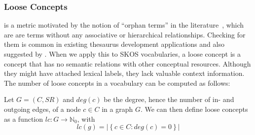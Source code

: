 \subsubsection{Loose Concepts} is a metric motivated by the notion of ``orphan terms'' in the literature~\cite{Hedden2010}, which are are terms without any associative or hierarchical relationships. Checking for them is common in existing thesaurus development applications and also suggested by \cite{Z39.19:2005}. When we apply this to SKOS vocabularies, a loose concept is a concept that has no semantic relations with other conceptual resources. Although they might have attached lexical labels, they lack valuable context information. The number of loose concepts in a vocabulary can be computed as follows:

\begin{definition}
Let \(G = (C, SR)\) and \(deg(c)\) be the degree, hence the number of in- and outgoing edges, of a node $c \in C$ in a graph $G$. We can then define loose concepts as a function \(lc : G \rightarrow \mathbb{N}_{0}\), with \[lc(g) = \left|\left\{c \in C : deg(c) = 0\right\}\right|\] 

\end{definition}


